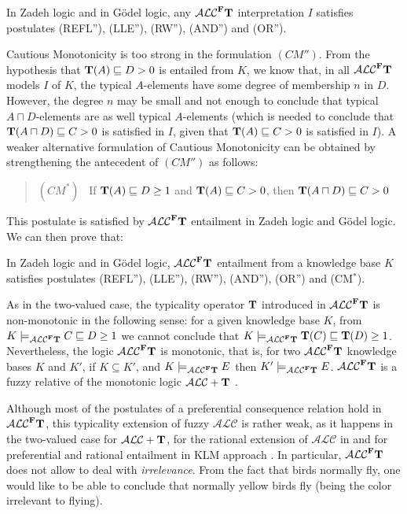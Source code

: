 \documentclass[runningheads]{llncs}
\newcommand{\tip}{{\bf T}}
\newcommand{\alc}{\mathcal{ALC}}
\newcommand{\alct}{\mathcal{ALC}+\tip}
\newcommand{\alcFt}{\mathcal{ALC}^{\Fe}\tip}
\newcommand {\Fe} {{\bf F}}
\begin{document}
\begin{proposition}  \label{prop:KLM_properties2}
In Zadeh logic and in G\"odel logic, any $\alcFt$ interpretation $I$ satisfies postulates (REFL''), (LLE''), (RW''), (AND'') and (OR'').
\end{proposition}

\noindent
Cautious Monotonicity is too strong in the formulation $(CM'')$. From the hypothesis that $\tip(A) \sqsubseteq D > 0$ is entailed from $K$, we know that, in all $\alcFt$ models $I$ of $K$, the typical $A$-elements have some degree of membership $n$ in $D$. However, the degree $n$ may be small and not enough to conclude that typical $A \sqcap D$-elements are as well typical $A$-elements (which is needed to conclude 
that $\tip(A \sqcap D) \sqsubseteq C > 0$ is satisfied in $I$, given that  $\tip(A) \sqsubseteq C > 0$ is satisfied in $I$).
A weaker alternative formulation of Cautious Monotonicity 
can be obtained by strengthening the antecedent of $(CM'')$ as follows:
\begin{quote} 
$(CM^*)$ \  If $\tip(A) \sqsubseteq D \geq 1$ and $\tip(A) \sqsubseteq C >0$, then $\tip(A \sqcap D) \sqsubseteq C >0$ 
\end{quote}
This postulate is satisfied by  $\alcFt$ entailment in Zadeh logic and G\"odel logic. We can then prove that: 


\begin{corollary}
In Zadeh logic and in G\"odel logic, $\alcFt$ entailment from a knowledge base $K$ satisfies postulates (REFL''), (LLE''), (RW''), (AND''), (OR'') and (CM$^*$).
\end{corollary}

As in the two-valued case,  the typicality operator $\tip$ introduced in $\alcFt$   
is non-monotonic in the following sense: for a given knowledge base $K$, from $K \models_{\alcFt} C \sqsubseteq D \geq 1$ we cannot conclude that
$K \models_{\alcFt} \tip(C) \sqsubseteq \tip(D) \geq 1$.
Nevertheless, the logic $\alcFt$ is monotonic, 
that is,  for two $\alcFt$ knowledge bases $K$ and $K'$, if $K \subseteq K'$, and $K \models_{\alcFt} E$ then 
$K' \models_{\alcFt} E$. 
 $\alcFt$ is a fuzzy relative of the monotonic logic $\alct$ \cite{FI09}.

Although most of the postulates of a preferential consequence relation hold in $\alcFt$,
this typicality extension of fuzzy $\alc$ is rather weak, as it happens in the two-valued case for
$\alct$, for the rational extension of $\alc$ in \cite{sudafricaniKR} and for preferential and rational entailment  in KLM approach \cite{whatdoes}. In particular, $\alcFt$ does not allow to deal with {\em irrelevance}. From the fact that birds normally fly, one would like to be able to conclude that normally yellow birds fly (being the color irrelevant to flying).  
\end{document}
